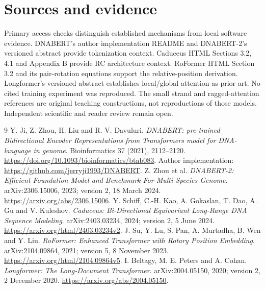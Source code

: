 \section*{Sources and evidence}
Primary access checks distinguish established mechanisms from local software
evidence. DNABERT's author implementation README and DNABERT-2's versioned
abstract provide tokenization context. Caduceus HTML Sections 3.2, 4.1 and
Appendix B provide RC architecture context. RoFormer HTML Section 3.2 and its
pair-rotation equations support the relative-position derivation. Longformer's
versioned abstract establishes local/global attention as prior art.
No cited training experiment was reproduced. The small strand and ragged-attention
references are original teaching constructions, not reproductions of those models.
Independent scientific and reader review remain open.

\begin{thebibliography}{9}
 Y. Ji, Z. Zhou, H. Liu and R. V. Davuluri.
\emph{DNABERT: pre-trained Bidirectional Encoder Representations from Transformers
model for DNA-language in genome}. Bioinformatics 37 (2021), 2112--2120.
\url{https://doi.org/10.1093/bioinformatics/btab083}.
Author implementation: \url{https://github.com/jerryji1993/DNABERT}.
 Z. Zhou et al.
\emph{DNABERT-2: Efficient Foundation Model and Benchmark For Multi-Species Genome}.
arXiv:2306.15006, 2023; version 2, 18 March 2024.
\url{https://arxiv.org/abs/2306.15006}.
 Y. Schiff, C.-H. Kao, A. Gokaslan,
T. Dao, A. Gu and V. Kuleshov.
\emph{Caduceus: Bi-Directional Equivariant Long-Range DNA Sequence Modeling}.
arXiv:2403.03234, 2024; version 2, 5 June 2024.
\url{https://arxiv.org/html/2403.03234v2}.
 J. Su, Y. Lu, S. Pan, A. Murtadha, B. Wen and Y. Liu.
\emph{RoFormer: Enhanced Transformer with Rotary Position Embedding}.
arXiv:2104.09864, 2021; version 5, 8 November 2023.
\url{https://arxiv.org/html/2104.09864v5}.
 I. Beltagy, M. E. Peters and A. Cohan.
\emph{Longformer: The Long-Document Transformer}.
arXiv:2004.05150, 2020; version 2, 2 December 2020.
\url{https://arxiv.org/abs/2004.05150}.
\end{thebibliography}
